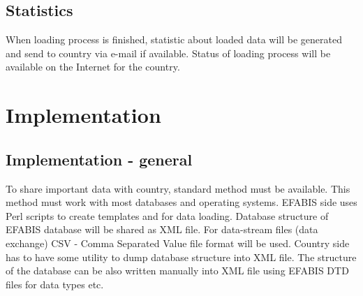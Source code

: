 \subsection{Statistics}
When loading process is finished, statistic about loaded data will be generated and send to country via e-mail if available.
Status of loading process will be available on the Internet for the country.


\newpage 
\section{Implementation}


\subsection{Implementation - general}

To share important data with country, standard method must be available. This method must work with most databases and operating systems. EFABIS side uses Perl scripts to create templates and for data loading. Database structure of EFABIS database will be shared as XML file. For data-stream files (data exchange) CSV - Comma Separated Value file format will be used. Country side has to have some utility to dump database structure into XML file. The structure of the database can be also written manually into XML file using EFABIS DTD files for data types etc. 

